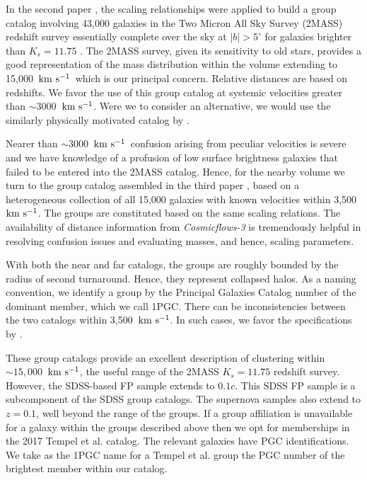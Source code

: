 \documentclass[twocolumn]{aastex63}
\newcommand{\kms}{\mbox{${\rm km~s^{-1}}$}}
\begin{document}
In the second paper \citep{2015AJ....149..171T}, the scaling relationships were applied to build a group catalog involving 43,000 galaxies in the Two Micron All Sky Survey (2MASS) redshift survey essentially complete over the sky at $\vert b \vert > 5^{\circ}$ for galaxies brighter than $K_s = 11.75$ \citep{2012ApJS..199...26H}.  The 2MASS survey, given its sensitivity to old stars, provides a good representation of the mass distribution within the volume extending to 15,000~\kms\ which is our principal concern.  Relative distances are based on redshifts.  We favor the use of this group catalog at systemic velocities greater than $\sim 3000$~\kms.  Were we to consider an alternative, we would use the similarly physically motivated catalog by \citet{2017MNRAS.470.2982L}.

Nearer than $\sim 3000$~\kms\ confusion arising from peculiar velocities is severe and we have knowledge of a profusion of low surface brightness galaxies that failed to be entered into the 2MASS catalog.  Hence, for the nearby volume we turn to the group catalog assembled in the third paper \citep{2017ApJ...843...16K}, based on a heterogeneous collection of all 15,000 galaxies with known velocities within 3,500~\kms.  The groups are constituted based on the same scaling relations.  The availability of distance information from {\it Cosmicflows-3} is tremendously helpful in resolving confusion issues and evaluating masses, and hence, scaling parameters.

With both the near and far catalogs, the groups are roughly bounded by the radius of second turnaround.  Hence, they represent collapsed halos.  As a naming convention, we identify a group by the Principal Galaxies Catalog number \citep{1996A&A...311...12P} of the dominant member, which we call 1PGC.  There can be inconsistencies between the two catalogs within 3,500~\kms.  In such cases, we favor the specifications by \citet{2017ApJ...843...16K}.

These group catalogs provide an excellent description of clustering within $\sim15,000$~\kms, the useful range of the 2MASS $K_s=11.75$ redshift survey.  However, the SDSS-based FP sample extends to $0.1c$.  This SDSS FP sample is a subcomponent of the \citet{2014A&A...566A...1T,2017A&A...602A.100T} SDSS group catalogs.  The supernova samples also extend to $z=0.1$, well beyond the range of the \citet{2015AJ....149..171T} groups.  If a group affiliation is unavailable for a galaxy within the groups described above then we opt for memberships in the 2017 Tempel et al. catalog.  The relevant galaxies have PGC identifications.  We take as the 1PGC name for a Tempel et al. group the PGC number of the brightest member within our catalog.
\end{document}
